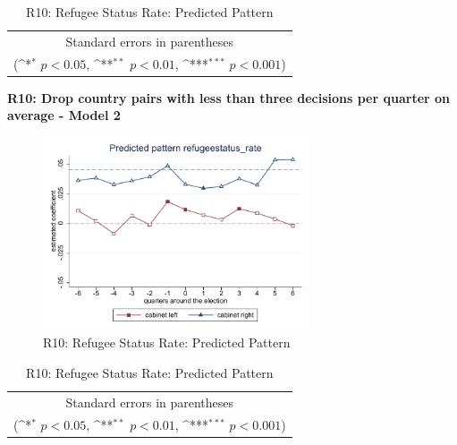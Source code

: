 \documentclass[10pt,a4paper]{scrartcl}
\begin{document}
\begin{table}[!ht]\centering
	\renewcommand{\arraystretch}{1.25}
	\def\sym#1{\ifmmode^{#1}\else\(^{#1}\)\fi}
	\caption{R10: Refugee Status Rate: Predicted Pattern}
	\begin{tabular}{l*{2}{c}}
		\hline\hline
		
		\hline\hline
		\multicolumn{3}{c}{\footnotesize Standard errors in parentheses} \\
		\multicolumn{3}{c}{\footnotesize (\sym{*} \(p<0.05\), \sym{**} \(p<0.01\), \sym{***} \(p<0.001\))}\\
	\end{tabular}
\end{table}

\clearpage
\textbf{R10: Drop country pairs with less than three decisions per quarter on average - Model 2}
\begin{figure}[!ht]
	\centering
	\includegraphics[width=0.7\textwidth]{figures_edited/refugeestatus_rate_graph2_R10.pdf}
	\caption{R10: Refugee Status Rate: Predicted Pattern}
\end{figure}

\begin{table}[!ht]\centering
	\footnotesize
	\renewcommand{\arraystretch}{1.2}
	\def\sym#1{\ifmmode^{#1}\else\(^{#1}\)\fi}
	\caption{R10: Refugee Status Rate: Predicted Pattern}
	\begin{tabular}{l*{2}{c}}
		\hline\hline
		
		\hline\hline
		\multicolumn{3}{c}{\footnotesize Standard errors in parentheses} \\
		\multicolumn{3}{c}{\footnotesize (\sym{*} \(p<0.05\), \sym{**} \(p<0.01\), \sym{***} \(p<0.001\))} \\
	\end{tabular}
\end{table}
\end{document}
